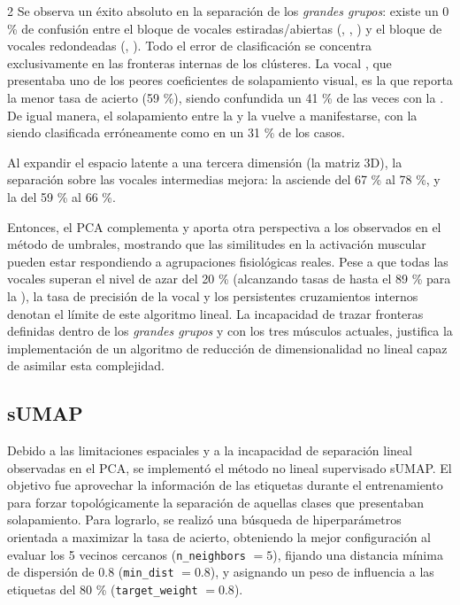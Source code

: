\documentclass[11pt, letterpaper]{article}
\begin{document}
\begin{multicols*}{2}
Se observa un éxito absoluto en la separación de los \textit{grandes grupos}: existe un 0 \% de confusión entre el bloque de vocales estiradas/abiertas (, , ) y el bloque de vocales redondeadas (, ). Todo el error de clasificación se concentra exclusivamente en las fronteras internas de los clústeres. La vocal , que presentaba uno de los peores coeficientes de solapamiento visual, es la que reporta la menor tasa de acierto (59 \%), siendo confundida un 41 \% de las veces con la . De igual manera, el solapamiento entre la  y la  vuelve a manifestarse, con la  siendo clasificada erróneamente como  en un 31 \% de los casos.

Al expandir el espacio latente a una tercera dimensión (la matriz 3D), la separación sobre las vocales intermedias mejora: la  asciende del 67 \% al 78 \%, y la  del 59 \% al 66 \%.

Entonces, el PCA complementa y aporta otra perspectiva a los  observados en el método de umbrales, mostrando que las similitudes en la activación muscular pueden estar respondiendo a agrupaciones fisiológicas reales. Pese a que todas las vocales superan el nivel de azar del 20 \% (alcanzando tasas de hasta el 89 \% para la ), la tasa de precisión de la vocal  y los persistentes cruzamientos internos denotan el límite de este algoritmo lineal. La incapacidad de trazar fronteras definidas dentro de los \textit{grandes grupos}  y  con los tres músculos actuales, justifica la implementación de un algoritmo de reducción de dimensionalidad no lineal capaz de asimilar esta complejidad.

\subsection{sUMAP}

Debido a las limitaciones espaciales y a la incapacidad de separación lineal observadas en el PCA, se implementó el método no lineal supervisado sUMAP. El objetivo fue aprovechar la información de las etiquetas durante el entrenamiento para forzar topológicamente la separación de aquellas clases que presentaban solapamiento. Para lograrlo, se realizó una búsqueda de hiperparámetros orientada a maximizar la tasa de acierto, obteniendo la mejor configuración al evaluar los 5 vecinos cercanos (\texttt{n\_neighbors} $=5$), fijando una distancia mínima de dispersión de $0.8$ (\texttt{min\_dist} $=0.8$), y asignando un peso de influencia a las etiquetas del 80 \% (\texttt{target\_weight} $=0.8$).


\end{multicols*}
\end{document}
